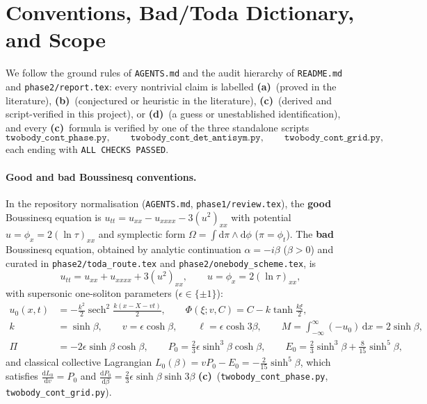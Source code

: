\documentclass[11pt,a4paper]{article}
\newcommand{\La}{\textbf{(a)}}
\newcommand{\Lb}{\textbf{(b)}}
\newcommand{\Lc}{\textbf{(c)}}
\newcommand{\Ld}{\textbf{(d)}}
\newcommand{\script}[1]{\texttt{#1}}
\newcommand{\dd}{\mathrm{d}}
\begin{document}
\tableofcontents

\section{Conventions, Bad/Toda Dictionary, and Scope}

We follow the ground rules of \texttt{AGENTS.md} and the audit hierarchy of \texttt{README.md} and \texttt{phase2/report.tex}: every nontrivial claim is labelled \La\ (proved in the literature), \Lb\ (conjectured or heuristic in the literature), \Lc\ (derived and script-verified in this project), or \Ld\ (a guess or unestablished identification), and every \Lc\ formula is verified by one of the three standalone scripts
\[
\script{twobody\_cont\_phase.py},\qquad
\script{twobody\_cont\_det\_antisym.py},\qquad
\script{twobody\_cont\_grid.py},
\]
each ending with \texttt{ALL CHECKS PASSED}.

\paragraph{Good and bad Boussinesq conventions.}
In the repository normalisation (\texttt{AGENTS.md}, \texttt{phase1/review.tex}), the \textbf{good} Boussinesq equation is $u_{tt}=u_{xx}-u_{xxxx}-3(u^2)_{xx}$ with potential $u=\phi_x=2(\ln\tau)_{xx}$ and symplectic form $\Omega=\int\dd\pi\wedge\dd\phi$ ($\pi=\phi_t$). The \textbf{bad} Boussinesq equation, obtained by analytic continuation $\alpha=-i\beta$ ($\beta>0$) and curated in \texttt{phase2/toda\_route.tex} and \texttt{phase2/onebody\_scheme.tex}, is
\begin{equation}\label{eq:bad_pde}
u_{tt}=u_{xx}+u_{xxxx}+3(u^2)_{xx},\qquad u=\phi_x=2(\ln\tau)_{xx},
\end{equation}
with supersonic one-soliton parameters ($\epsilon\in\{\pm 1\}$):
\begin{equation}\label{eq:bad_onesol}
\begin{aligned}
u_0(x,t)&=-\frac{k^2}{2}\operatorname{sech}^2\frac{k(x-X-vt)}{2},\qquad \Phi(\xi;v,C)=C-k\tanh\frac{k\xi}{2},\\
k&=\sinh\beta,\qquad v=\epsilon\cosh\beta,\qquad \ell=\epsilon\cosh 3\beta,\qquad M=\int_{-\infty}^\infty(-u_0)\,\dd x=2\sinh\beta,\\
\Pi&=-2\epsilon\sinh\beta\cosh\beta,\qquad P_0=\frac23\epsilon\sinh^3\beta\cosh\beta,\qquad E_0=\frac23\sinh^3\beta+\frac{8}{15}\sinh^5\beta,
\end{aligned}
\end{equation}
and classical collective Lagrangian $L_0(\beta)=vP_0-E_0=-\frac{2}{15}\sinh^5\beta$, which satisfies $\frac{\dd L_0}{\dd v}=P_0$ and $\frac{\dd P_0}{\dd\beta}=\frac23\epsilon\sinh\beta\sinh 3\beta$ \Lc\ (\script{twobody\_cont\_phase.py}, \script{twobody\_cont\_grid.py}).
\end{document}
